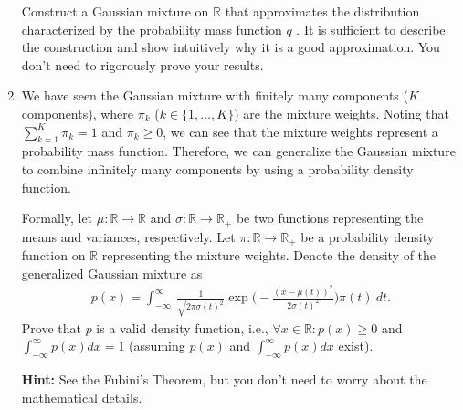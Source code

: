 \begin{Q}
\begin{enumerate}
Construct a Gaussian mixture on $\mathbb{R}$ that approximates the distribution characterized by the probability mass function $q$ . It is sufficient to describe the construction and show intuitively why it is a good approximation.  You don't need to rigorously prove your results.

\item We have seen the Gaussian mixture with finitely many components ($K$ components), where $\pi_k$ ($k\in \{1, \dots, K\}$) are the mixture weights. Noting that $\sum_{k=1}^K \pi_k=1$ and $\pi_k\geq 0$, we can see that the mixture weights represent a probability mass function. Therefore, we can generalize the Gaussian mixture to combine infinitely many components by using a probability density function.

Formally, let $\mu:\mathbb{R}\to \mathbb{R}$ and $\sigma:\mathbb{R}\to \mathbb{R}_+$ be two functions representing the means and variances, respectively. Let $\pi:\mathbb{R}\to \mathbb{R}_+$ be a probability density function on $\mathbb{R}$ representing the mixture weights. Denote the density of the generalized Gaussian mixture as
\begin{align}
    p(x)=\int_{-\infty}^{\infty} \ \frac{1}{\sqrt{2 \pi \sigma(t)^{2} }} \exp\Big( - \frac{(x - \mu(t) )^2}{2 \sigma(t)^2 } \Big) \pi(t) \ dt.
\end{align}
Prove that $p$ is a valid density function, i.e., $\forall x\in \mathbb{R}:p(x)\geq0$  and $\int_{-\infty}^{\infty} p(x)dx=1$ (assuming $p(x)$ and $\int_{-\infty}^{\infty} p(x)dx$ exist). 

\textbf{Hint:} See the Fubini's Theorem, but you don't need to worry about the mathematical details. 
\end{enumerate}

\end{Q}

\begin{tcolorbox}


\end{tcolorbox}
